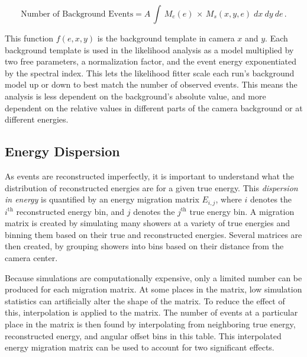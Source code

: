     \begin{equation}\label{eqn:background_template_function}
      \textrm{Number of Background Events} = A \, \int \, M_{e} \left ( e \right ) \, \times \, M_{s} \left ( x, y, e \right ) \; dx \: dy \: de \,.
    \end{equation}

    This function $f(e,x,y)$ is the background template in camera $x$ and $y$.
    Each background template is used in the likelihood analysis as a model multiplied by two free parameters, a normalization factor, and the event energy exponentiated by the spectral index.
    This lets the likelihood fitter scale each run's background model up or down to best match the number of observed events.
    This means the analysis is less dependent on the background's absolute value, and more dependent on the relative values in different parts of the camera background or at different energies.
  
  \FloatBarrier

  \subsection{Energy Dispersion}\label{subsec:edisp}
    As events are reconstructed imperfectly, it is important to understand what the distribution of reconstructed energies are for a given true energy.
    This \textit{dispersion in energy} is quantified by an energy migration matrix $E_{i,j}$, where $i$ denotes the $i^{\text{th}}$ reconstructed energy bin, and $j$ denotes the $j^{\text{th}}$ true energy bin.
    A migration matrix is created by simulating many showers at a variety of true energies and binning them based on their true and reconstructed energies.
    Several matrices are then created, by grouping showers into bins based on their distance from the camera center.
    
    Because simulations are computationally expensive, only a limited number can be produced for each migration matrix.
    At some places in the matrix, low simulation statistics can artificially alter the shape of the matrix.
    To reduce the effect of this, interpolation is applied to the matrix.
    The number of events at a particular place in the matrix is then found by interpolating from neighboring true energy, reconstructed energy, and angular offset bins in this table.
    This interpolated  energy migration matrix can be used to account for two significant effects.
    
